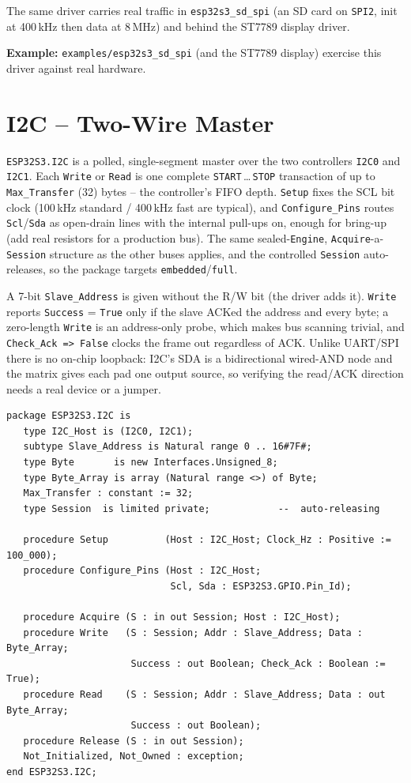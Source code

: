 The same driver carries real traffic in \texttt{esp32s3\_sd\_spi} (an SD card on
\texttt{SPI2}, init at 400\,kHz then data at 8\,MHz) and behind the ST7789
display driver.

\noindent\textbf{Example:} \texttt{examples/esp32s3\_sd\_spi} (and the ST7789
display) exercise this driver against real hardware.

\section{I2C -- Two-Wire Master}
\label{app:int:i2c}

\texttt{ESP32S3.I2C} is a polled, single-segment master over the two
controllers \texttt{I2C0} and \texttt{I2C1}. Each \texttt{Write} or
\texttt{Read} is one complete \texttt{START}\,\ldots\,\texttt{STOP} transaction
of up to \texttt{Max\_Transfer} (32) bytes -- the controller's FIFO depth.
\texttt{Setup} fixes the SCL bit clock (100\,kHz standard / 400\,kHz fast are
typical), and \texttt{Configure\_Pins} routes \texttt{Scl}/\texttt{Sda} as
open-drain lines with the internal pull-ups on, enough for bring-up (add real
resistors for a production bus). The same sealed-\texttt{Engine},
\texttt{Acquire}-a-\texttt{Session} structure as the other buses applies, and the
controlled \texttt{Session} auto-releases, so the package targets
\texttt{embedded}/\texttt{full}.

A 7-bit \texttt{Slave\_Address} is given without the R/W bit (the driver adds
it). \texttt{Write} reports \texttt{Success} = \texttt{True} only if the slave
ACKed the address and every byte; a zero-length \texttt{Write} is an
address-only probe, which makes bus scanning trivial, and \texttt{Check\_Ack =>
False} clocks the frame out regardless of ACK. Unlike UART/SPI there is no
on-chip loopback: I2C's SDA is a bidirectional wired-AND node and the matrix
gives each pad one output source, so verifying the read/ACK direction needs a
real device or a jumper.

\begin{lstlisting}
package ESP32S3.I2C is
   type I2C_Host is (I2C0, I2C1);
   subtype Slave_Address is Natural range 0 .. 16#7F#;
   type Byte       is new Interfaces.Unsigned_8;
   type Byte_Array is array (Natural range <>) of Byte;
   Max_Transfer : constant := 32;
   type Session  is limited private;            --  auto-releasing

   procedure Setup          (Host : I2C_Host; Clock_Hz : Positive := 100_000);
   procedure Configure_Pins (Host : I2C_Host;
                             Scl, Sda : ESP32S3.GPIO.Pin_Id);

   procedure Acquire (S : in out Session; Host : I2C_Host);
   procedure Write   (S : Session; Addr : Slave_Address; Data : Byte_Array;
                      Success : out Boolean; Check_Ack : Boolean := True);
   procedure Read    (S : Session; Addr : Slave_Address; Data : out Byte_Array;
                      Success : out Boolean);
   procedure Release (S : in out Session);
   Not_Initialized, Not_Owned : exception;
end ESP32S3.I2C;
\end{lstlisting}

